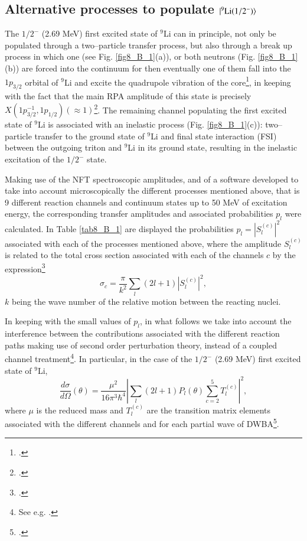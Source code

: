 \begin{subappendices}
\section{Alternative processes to populate $|{^9\text{Li}(1/2^-)} \rangle$}\label{C8AppB}
The $1/2^-$ (2.69 MeV) first excited state of $^9$Li can in principle, not only be populated through a two--particle transfer process, but also through a break up process in which one (see Fig. \ref{fig8_B_1}(a)), or both neutrons (Fig. \ref{fig8_B_1}(b)) are forced into the continuum for then eventually one of them fall into the $1p_{3/2}$ orbital of $^9$Li and excite the quadrupole vibration of the core\footnote{\cite{Potel:10}.}, in keeping with the fact that the main RPA amplitude of this state is precisely $X(1p^{-1}_{3/2},1p_{1/2})(\approx 1)$\footnote{\cite{Barranco:01}.}. The remaining channel populating the first excited state of $^9$Li is associated with an inelastic process (Fig. \ref{fig8_B_1}(c)): two--particle transfer to the ground state of $^{9}$Li and final state interaction (FSI) between the outgoing triton and $^{9}$Li in its ground state, resulting in the inelastic excitation of  the $1/2^-$ state.


Making use of the NFT spectroscopic amplitudes, and of a software developed  to take into account microscopically  the different processes mentioned above, that is 9 different reaction channels and continuum states up to 50 MeV of excitation energy, the corresponding transfer amplitudes and associated probabilities $p_l$ were calculated.
 In Table \ref{tab8_B_1} are displayed the probabilities $p_l=|S_l^{(c)}|^2$ associated with each of the processes mentioned above, where the amplitude $S_l^{(c)}$ is related to the total cross section associated with each of the channels $c$  by the expression\footnote{\cite{Satchler:80,Landau:81}.}
\begin{equation}\label{eq6B1}
    \sigma_c=\frac{\pi}{k^2}\sum_l(2l+1)|S_l^{(c)}|^2,
\end{equation}
$k$ being the wave number of the relative motion between the reacting nuclei.



 In keeping with the small values of $p_l$, in what follows we take into account the interference between the contributions associated with the different reaction paths making use of second order perturbation theory, instead of a coupled channel treatment\footnote{See e.g.  \cite{Ascuitto:69} \cite{Tamura:70} \cite{Khoa:04} \cite{Keeley:07b} \cite{Thompson:88}.}. In particular, in the case of the $1/2^-$ (2.69 MeV) first excited state of $^9$Li,
\begin{equation}
    \frac{d\sigma}{d\Omega}(\theta)=\frac{\mu^2}{16\pi^3\hbar^4}\left|\sum_l(2l+1)P_l(\theta)\sum_{c=2}^5 T^{(c)}_l\right|^2,
\end{equation}
where $\mu$ is the reduced mass and $T^{(c)}_l$ are the transition matrix elements associated with the different channels and for each partial wave of DWBA\footnote{\cite{Satchler:80}.}.


\end{subappendices}
